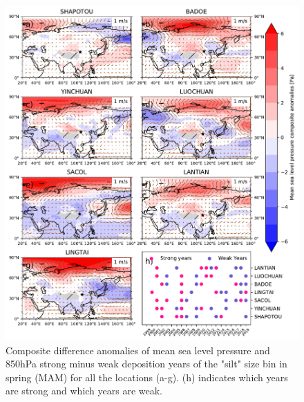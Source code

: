 \begin{figure}[htbp]
    \centering
    \includegraphics[width=\textwidth]{texfiles/figs/mslp_850hPa_20micron_MAM.pdf}
    \caption{Composite difference anomalies of mean sea level pressure and 850hPa strong minus weak deposition years of the "silt" size bin in spring (MAM) for all the locations (a-g).  (h) indicates which years are strong and which years are weak.}
    \label{fig:MAM_850_coarse_composite}
\end{figure}


